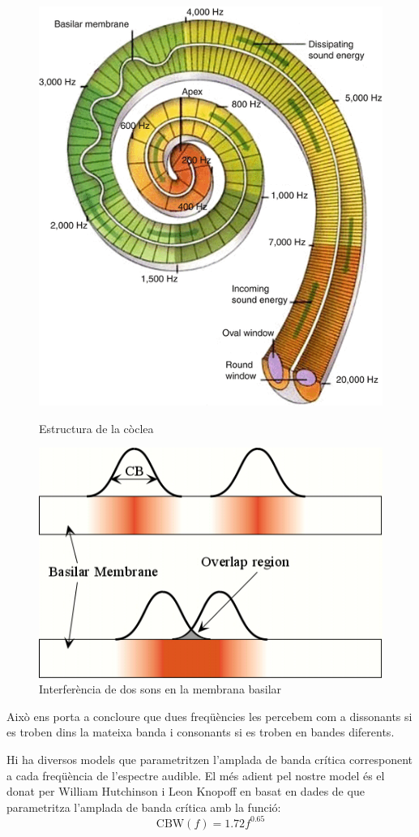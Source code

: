 \documentclass{article}
\theoremstyle{definition}
\begin{document}
\begin{figure}
    \begin{minipage}[c]{0.49\linewidth}
        \centering
        \includegraphics[height=0.6\linewidth]{Imatges_beamer2/coclea.png}
        \caption{Estructura de la còclea}
        \label{coclea}
    \end{minipage}
    \hfill
    \begin{minipage}[c]{0.49\linewidth}
        \centering
        \includegraphics[height=0.6\linewidth]{Imatges_beamer2/basilar_membrane.jpg}
        \caption{Interferència de dos sons en la mem\-bra\-na basilar}
        \label{membrana}
    \end{minipage}
\end{figure}
Això ens porta a concloure que dues freqüències les percebem com a dissonants si es troben dins la mateixa banda i consonants si es troben en bandes diferents. \par
Hi ha diversos models que parametritzen l'amplada de banda crítica corresponent a cada freqüència de l'espectre audible. El més adient pel nostre model és el donat per William Hutchinson i Leon Knopoff en \cite{hutchinson} basat en dades de \cite{plomp,goodwin,mayer} que parametritza l'amplada de banda crítica amb la funció:
\begin{equation}
    \text{CBW}(f)=1.72 f^{0.65}
    \label{CBW}
\end{equation}
\end{document}
